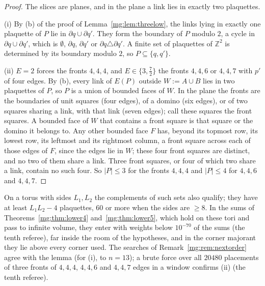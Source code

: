 \documentclass[11pt,a4paper]{article}
\theoremstyle{definition}
\theoremstyle{remark}
\newcommand{\Z}{\mathbb{Z}}
\begin{document}
\begin{proof}
The slices are planes, and in the plane a link lies in exactly two plaquettes.

(i) By (b) of the proof of Lemma~\ref{mg:lem:threelow}, the links lying in exactly one plaquette of $P$ lie in $\partial q\cup\partial q'$. They form the boundary of $P$ modulo $2$, a cycle in
$\partial q\cup\partial q'$, which is $\emptyset$, $\partial q$, $\partial q'$ or $\partial q\triangle\partial q'$. A finite set of plaquettes of $\Z^2$ is determined by its boundary modulo $2$,
so $P\subseteq\{q,q'\}$.

(ii) $E=2$ forces the fronts $4,4,4$, and $E\in\{3,\frac72\}$ the fronts $4,4,6$ or $4,4,7$ with $p'$ of four edges. By (b), every link of $E(P)$ outside $W:=A\cup B$ lies in two plaquettes of
$P$, so $P$ is a union of bounded faces of $W$. In the plane the fronts are the boundaries of unit squares (four edges), of a domino (six edges), or of two squares sharing a link, with that link
(seven edges); call these squares the front squares. A bounded face of $W$ that contains a front square is that square or the domino it belongs to. Any other bounded face $F$ has, beyond its
topmost row, its lowest row, its leftmost and its rightmost column, a front square across each of those edges of $F$, since the edges lie in $W$; these four front squares are distinct, and no
two of them share a link. Three
front squares, or four of which two share a link, contain no such four. So $|P|\le3$ for the fronts $4,4,4$ and $|P|\le4$ for $4,4,6$ and $4,4,7$.
\end{proof}

On a torus with sides $L_1,L_2$ the complements of such sets also qualify; they have at least $L_1L_2-4$ plaquettes, $60$ or more when the sides are $\ge8$. In the sums of
Theorems~\ref{mg:thm:lower4} and~\ref{mg:thm:lower5}, which hold on these tori and pass to infinite volume, they enter with weights below $10^{-70}$ of the sums (the tenth referee), far inside
the room of the hypotheses, and in the corner majorant they lie above every corner used. The searches of Remark~\ref{mg:rem:nextorder} agree with the lemma (for (i), to $n=13$); a brute force over
all $20480$ placements of three fronts of $4,4,4$, $4,4,6$ and $4,4,7$ edges in a window confirms (ii) (the tenth referee).
\end{document}
